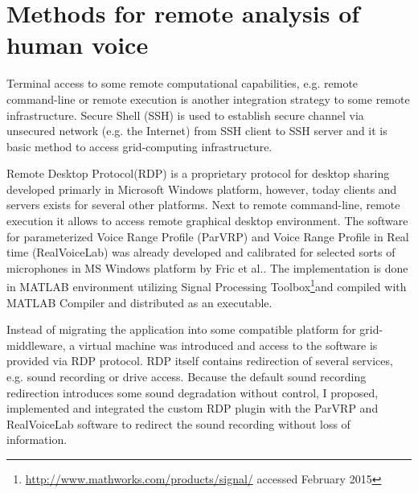 \section{Methods for remote analysis of human voice}
\label{sec:methodsvoice}
Terminal access to some remote computational capabilities, e.g. remote command-line or remote execution is another integration strategy to some remote infrastructure. Secure Shell (SSH) is used to establish secure channel via unsecured network (e.g. the Internet) from SSH client to SSH server and it is basic method to access grid-computing infrastructure. 

Remote Desktop Protocol(RDP) is a proprietary protocol for desktop sharing developed primarly in Microsoft Windows platform, however, today clients and servers exists for several other platforms. Next to remote command-line, remote execution it allows to access remote graphical desktop environment. %
The software for parameterized Voice Range Profile (ParVRP) and Voice Range Profile in Real time (RealVoiceLab) was already developed and calibrated for selected sorts of microphones in MS Windows platform by Fric et al.\cite{Fric2007,Fric2012}. The implementation is done in MATLAB environment utilizing Signal Processing Toolbox\footnote{\url{http://www.mathworks.com/products/signal/} accessed February 2015}and compiled with MATLAB Compiler and distributed as an executable.

Instead of migrating the application into some compatible platform for grid-middleware, a virtual machine was introduced and access to the software is provided via RDP protocol. RDP itself contains redirection of several services, e.g. sound recording or drive access. Because the default sound recording redirection introduces some sound degradation without control, I proposed, implemented and integrated the custom RDP plugin with the ParVRP and RealVoiceLab software to redirect the sound recording without loss of information. 

